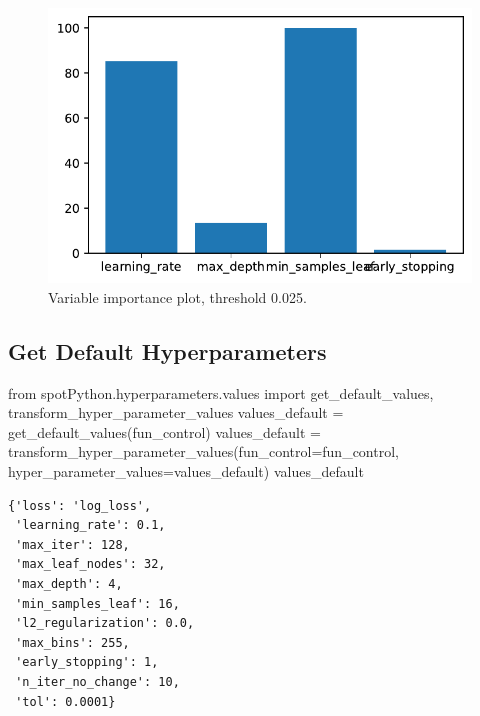 \documentclass[
  letterpaper,
  DIV=11,
  numbers=noendperiod]{scrreprt}
\newenvironment{Shaded}{\begin{snugshade}}{\end{snugshade}}
\newcommand{\ImportTok}[1]{\textcolor[rgb]{0.00,0.46,0.62}{#1}}
\newcommand{\NormalTok}[1]{\textcolor[rgb]{0.00,0.23,0.31}{#1}}
\newcommand{\OperatorTok}[1]{\textcolor[rgb]{0.37,0.37,0.37}{#1}}
\begin{document}
\begin{figure}[H]

{\centering \includegraphics{17_spot_hpt_sklearn_multiclass_classification_xgb_files/figure-pdf/cell-28-output-1.pdf}

}

\caption{Variable importance plot, threshold 0.025.}

\end{figure}

\hypertarget{get-default-hyperparameters-4}{%
\subsection{Get Default
Hyperparameters}\label{get-default-hyperparameters-4}}

\begin{Shaded}
\begin{Highlighting}[]
\ImportTok{from}\NormalTok{ spotPython.hyperparameters.values }\ImportTok{import}\NormalTok{ get\_default\_values, transform\_hyper\_parameter\_values}
\NormalTok{values\_default }\OperatorTok{=}\NormalTok{ get\_default\_values(fun\_control)}
\NormalTok{values\_default }\OperatorTok{=}\NormalTok{ transform\_hyper\_parameter\_values(fun\_control}\OperatorTok{=}\NormalTok{fun\_control, hyper\_parameter\_values}\OperatorTok{=}\NormalTok{values\_default)}
\NormalTok{values\_default}
\end{Highlighting}
\end{Shaded}

\begin{verbatim}
{'loss': 'log_loss',
 'learning_rate': 0.1,
 'max_iter': 128,
 'max_leaf_nodes': 32,
 'max_depth': 4,
 'min_samples_leaf': 16,
 'l2_regularization': 0.0,
 'max_bins': 255,
 'early_stopping': 1,
 'n_iter_no_change': 10,
 'tol': 0.0001}
\end{verbatim}
\end{document}
